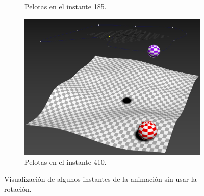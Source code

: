 \begin{figure}[H]
\begin{subfigure}[t]{0.48\textwidth}
        \caption{Pelotas en el instante 185.}
    \end{subfigure}    
    \par\bigskip
	\begin{subfigure}[t]{0.48\textwidth}
	    \centering
	    \includegraphics[width=\textwidth]{imagenes/posicion/410.jpg}
        \caption{Pelotas en el instante 410.}
    \end{subfigure}        
    \caption{Visualización de algunos instantes de la animación sin usar la rotación.}
\end{figure}